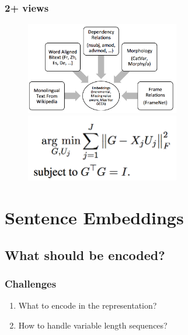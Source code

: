 \documentclass{beamer}
\newcommand{\be}{\begin{enumerate}}
\newcommand{\ee}{\end{enumerate}}
\begin{document}
\begin{frame}
\frametitle{2+ views \cite{rastogi15multiview}}
\begin{figure}[htbp]
\begin{center}
\includegraphics[width=0.6\textwidth]{figs/rastogi15a}\\
\includegraphics[width=0.6\textwidth]{figs/rastogi15b}
\end{center}
\end{figure}
\end{frame}

\section[Sentence Embedding]{Sentence Embeddings}

\subsection[What should be encoded]{What should be encoded?}

\begin{frame}
\frametitle{Challenges}
\be
\item What to encode in the representation?
\item How to handle variable length sequences?
\ee
\end{frame}
\end{document}

